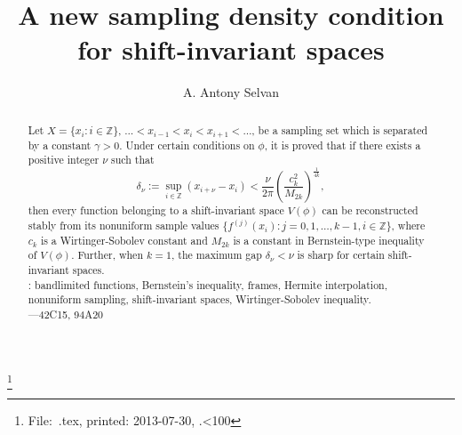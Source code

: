 \documentclass[a4paper,12pt,reqno]{amsart}
\theoremstyle{plain}
\numberwithin{equation}{section}
\theoremstyle{definition}
\newcounter{minutes}\setcounter{minutes}{\time}
\newcounter{hours}\setcounter{hours}{\time}
\begin{document}

\title{A new sampling density condition for shift-invariant spaces}

\thanks{%
File:~\jobname .tex,
          printed: 2013-07-30,
          \thehours.\ifnum\theminutes<10{0}\fi\theminutes}

\author{A. Antony Selvan}

\address{A. Antony Selvan, Post Doctoral Fellow,
The Institute of Mathematical Sciences, Chennai--600 113, India.}
%
\maketitle
\pagestyle{myheadings}


\begin{abstract}
Let $X=\{x_i:i\in\mathbb{Z}\}$, $\dots<x_{i-1}<x_i<x_{i+1}<\dots$, be a sampling set which is separated by a constant $\gamma>0$. Under certain conditions on $\phi$, it is proved that 
if there exists a positive integer $\nu$ such that 
$$\delta_\nu:=\sup\limits_{i\in\mathbb{Z}}(x_{i+\nu}-x_i)<\dfrac{\nu}{2\pi}\left(\dfrac{c_{k}^2}{M_{2k}}\right)^{\frac{1}{4k}},$$ then 
every function belonging to a shift-invariant space $V(\phi)$  can be reconstructed stably from its nonuniform sample values  $\{f^{(j)}(x_i):j=0,1,\dots, k-1, i\in\mathbb{Z}\}$,
where $c_k$ is a Wirtinger-Sobolev constant and $M_{2k}$ is a constant in Bernstein-type  inequality of $V(\phi)$. Further, when $k=1$, the maximum gap 
$\delta_\nu<\nu$ is sharp for certain shift-invariant spaces.
\vspace{5mm} \\
 : bandlimited functions, Bernstein's inequality, frames, Hermite interpolation, nonuniform sampling, shift-invariant spaces, Wirtinger-Sobolev inequality.
\vspace{3mm}\\
 ---42C15, 94A20
\end{abstract}
\end{document}

